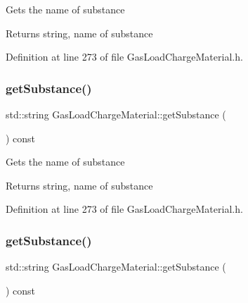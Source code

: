 Gets the name of substance

\begin{DoxyReturn}{Returns}
string, name of substance 
\end{DoxyReturn}


Definition at line 273 of file Gas\+Load\+Charge\+Material.\+h.

\mbox{\label{class_gas_load_charge_material_a5f967841f196f6b0b35f32f9610092e3}} 
\subsubsection{\texorpdfstring{get\+Substance()}{getSubstance()}\hspace{0.1cm}{\footnotesize\ttfamily [2/3]}}
{\footnotesize\ttfamily std\+::string Gas\+Load\+Charge\+Material\+::get\+Substance (\begin{DoxyParamCaption}{ }\end{DoxyParamCaption}) const\hspace{0.3cm}{\ttfamily [inline]}}

Gets the name of substance

\begin{DoxyReturn}{Returns}
string, name of substance 
\end{DoxyReturn}


Definition at line 273 of file Gas\+Load\+Charge\+Material.\+h.

\mbox{\label{class_gas_load_charge_material_a5f967841f196f6b0b35f32f9610092e3}} 
\subsubsection{\texorpdfstring{get\+Substance()}{getSubstance()}\hspace{0.1cm}{\footnotesize\ttfamily [3/3]}}
{\footnotesize\ttfamily std\+::string Gas\+Load\+Charge\+Material\+::get\+Substance (\begin{DoxyParamCaption}{ }\end{DoxyParamCaption}) const\hspace{0.3cm}{\ttfamily [inline]}}

